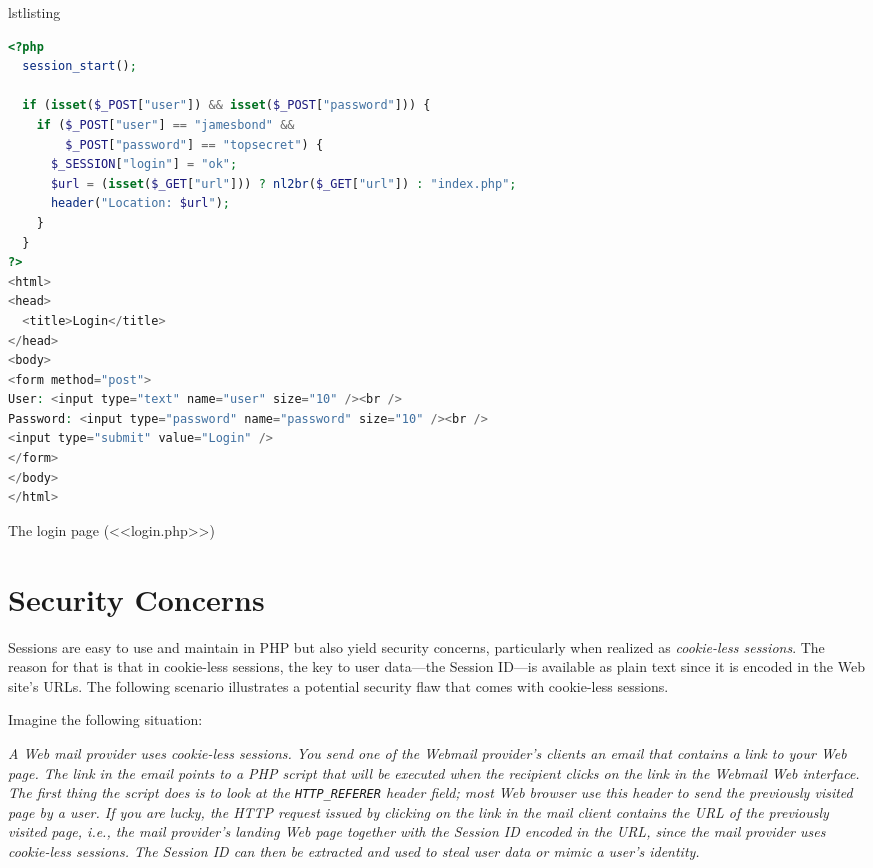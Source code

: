 \documentclass[a4paper, justified, notoc]{tufte-handout} %
\makeatletter
\newenvironment{listing}[1][htbp]
  {\ifvmode\else\unskip\fi\begin{@tufte@float}[#1]{lstlisting}{}}
  {\end{@tufte@float} } %
\makeatother
\begin{document}
\begin{listing}
\begin{lstlisting}[language=PHP]
<?php
  session_start();

  if (isset($_POST["user"]) && isset($_POST["password"])) {
    if ($_POST["user"] == "jamesbond" && 
        $_POST["password"] == "topsecret") {
      $_SESSION["login"] = "ok";
      $url = (isset($_GET["url"])) ? nl2br($_GET["url"]) : "index.php";
      header("Location: $url");
    }
  }
?>
<html>
<head>
  <title>Login</title>
</head>
<body>
<form method="post">
User: <input type="text" name="user" size="10" /><br />
Password: <input type="password" name="password" size="10" /><br />
<input type="submit" value="Login" />
</form>
</body>
</html>
\end{lstlisting}
	\caption{The login page (<<login.php>>)}
	\label{login_page}
\end{listing}

\newpage
\section{Security Concerns} %
\label{sec:security_concerns}
Sessions are easy to use and maintain in PHP but also yield security concerns, particularly when realized as \emph{cookie-less sessions}. 
The reason for that is that in cookie-less sessions, the key to user data---the Session ID---is available as plain text since it is encoded in the Web site's URLs.
The following scenario illustrates a potential security flaw that comes with cookie-less sessions.

Imagine the following situation:

\emph{A Web mail provider uses cookie-less sessions.
You send one of the Webmail provider's clients an email that contains a link to your Web page.
The link in the email points to a PHP script that will be executed when the recipient clicks on the link in the Webmail Web interface.
The first thing the script does is to look at the \texttt{HTTP\_REFERER} header field; 
most Web browser use this header to send the previously visited page by a user. 
If you are lucky, the HTTP request issued by clicking on the link in the mail client contains the URL of the previously visited page, i.e., the mail provider's landing Web page together with the Session ID encoded in the URL, since the mail provider uses cookie-less sessions. The Session ID can then be extracted and used to steal user data or mimic a user's identity.}
\end{document}
